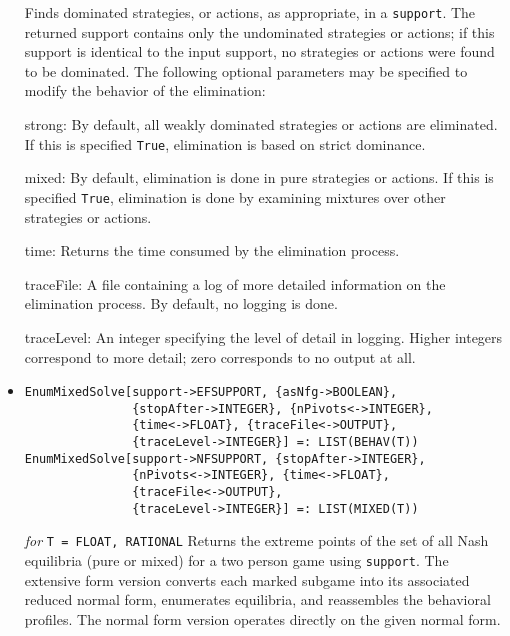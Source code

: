 \begin{itemize}
\bd
Finds dominated strategies, or actions, as appropriate, in a 
\verb+support+.  The returned support contains only the undominated
strategies or actions; if this support is identical to the input support,
no strategies or actions were found to be dominated.  The following
optional parameters may be specified to modify the behavior of
the elimination:

\bd
\item [strong:] By default, all weakly dominated strategies or actions
are eliminated.  If this is specified \verb+True+, elimination is based
on strict dominance.
\item [mixed:] By default, elimination is done in pure strategies or
actions.  If this is specified \verb+True+, elimination is done by
examining mixtures over other strategies or actions.
\item [time:] Returns the time consumed by the elimination process.
\item [traceFile:] A file containing a log of more detailed information
on the elimination process.  By default, no logging is done.
\item [traceLevel:] An integer specifying the level of detail in logging.
Higher integers correspond to more detail; zero corresponds to no output
at all.
\ed
\ed

\item
\protect \large \begin{verbatim}
EnumMixedSolve[support->EFSUPPORT, {asNfg->BOOLEAN}, 
               {stopAfter->INTEGER}, {nPivots<->INTEGER}, 
               {time<->FLOAT}, {traceFile<->OUTPUT},
               {traceLevel->INTEGER}] =: LIST(BEHAV(T))
EnumMixedSolve[support->NFSUPPORT, {stopAfter->INTEGER},
               {nPivots<->INTEGER}, {time<->FLOAT},
               {traceFile<->OUTPUT},
               {traceLevel->INTEGER}] =: LIST(MIXED(T))
\end{verbatim}\normalsize

{\it for} {\tt T = FLOAT, RATIONAL}
\bd
Returns the extreme points of the set of all Nash equilibria (pure or
mixed) for a two person game using \verb+support+.
The extensive form version converts
each marked subgame into its associated reduced normal form, enumerates
equilibria, and reassembles the behavioral profiles.  The normal form
version operates directly on the given normal form.


\end{itemize}
